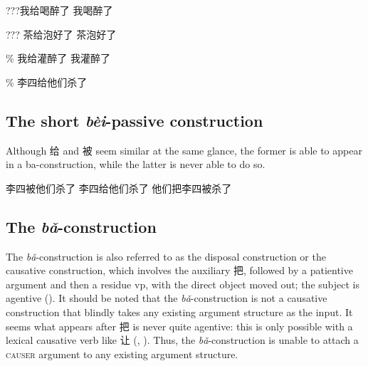\documentclass[UTF8, a4paper, oneside, scheme=plain]{ctexrep}
\newcommand{\corpus}[1]{\emph{#1}}
\newcommand*{\category}[1]{\textsc{#1}}
\begin{document}
\begin{exe}
    \ex \begin{xlist}
        \ex ???我给喝醉了
        \ex 我喝醉了
    \end{xlist}
    \ex \begin{exe}
        \ex ??? 茶给泡好了
        \ex 茶泡好了
    \end{exe}
    \ex \begin{xlist}
        \ex \% 我给灌醉了
        \ex *我灌醉了
    \end{xlist}
\end{exe}

\begin{exe}
    \ex\label{ex:verb-phrase.gei.2} \% 李四给他们杀了
\end{exe}

\subsection{The short \corpus{bèi}-passive construction}\label{sec:verb-phrase.object.short-bei}

Although 给 and 被 seem similar at the same glance, 
the former is able to appear in a ba-construction, 
while the latter is never able to do so. 

\begin{exe}
    \ex 李四被他们杀了
    \ex 李四给他们杀了
    \ex *他们把李四被杀了
\end{exe}


\subsection{The \corpus{bǎ}-construction}\label{sec:verb-phrase.object.ba}

The \corpus{bǎ}-construction is also referred to as 
the disposal construction or the causative construction,
which involves the auxiliary 把, followed by a patientive argument 
and then a residue \acs{vp},
with the direct object moved out;
the subject is agentive ().
It should be noted that the \corpus{bǎ}-construction is not
a causative construction that blindly takes any existing argument structure as the input.
It seems what appears after 把 is never quite agentive:
this is only possible with a lexical causative verb like 让
(, ).
Thus, the \corpus{bǎ}-construction is unable to attach a \category{causer} argument 
to any existing argument structure. 
\end{document}
